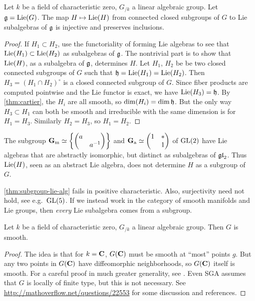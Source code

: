 \begin{theorem}\label{thm:subgroup-lie-alg}
Let $k$ be a field of characteristic zero, $G_{/k}$ a linear algebraic group. 
Let $\mathfrak{g}=\operatorname{Lie}(G)$. The map $H\mapsto \operatorname{Lie}(H)$ from connected closed subgroups 
of $G$ to Lie subalgebras of $\mathfrak{g}$ is injective and preserves inclusions. 
\end{theorem}
\begin{proof}
If $H_1\subset H_2$, use the functoriality of forming Lie algebras to see that 
$\operatorname{Lie}(H_1)\subset \operatorname{Lie}(H_2)$ as subalgebras of $\mathfrak{g}$. The nontrivial part is to 
show that $\operatorname{Lie}(H)$, as a subalgebra of $\mathfrak{g}$, determines $H$. 
Let $H_1$, $H_2$ be be two closed connected subgroups of $G$ such that 
$\mathfrak{h}=\operatorname{Lie}(H_1)=\operatorname{Lie}(H_2)$. Then $H_3=(H_1\cap H_2)^\circ$ is a closed connected 
subgroup of $G$. Since fiber products are computed pointwise and the Lie 
functor is exact, we have $\operatorname{Lie}(H_3)=\mathfrak{h}$. By \autoref{thm:cartier}, the 
$H_i$ are all smooth, so $\dim(H_i)=\dim \mathfrak{h}$. But the only way 
$H_3\subset H_1$ can both be smooth and irreducible with the same dimension is 
for $H_1=H_3$. Similarly $H_2=H_3$, so $H_1=H_2$. 
\end{proof}

\begin{example}
The subgroup 
$\mathbf{G}_\mathrm{m}\simeq \left\{\begin{pmatrix} a \\ & a^{-1} \end{pmatrix}\right\}$ 
and $\mathbf{G}_\mathrm{a}\simeq \begin{pmatrix} 1 & \ast \\ & 1 \end{pmatrix}$ of $\operatorname{GL}(2)$ have 
Lie algebras that are abstractly isomorphic, but distinct as subalgebras of 
$\mathfrak{gl}_2$. Thus $\operatorname{Lie}(H)$, seen as an abstract Lie algebra, does not determine 
$H$ as a subgroup of $G$. 
\end{example}

\autoref{thm:subgroup-lie-alg} fails in positive characteristic. Also, 
surjectivity need not hold, see e.g.~$\operatorname{GL}(5)$. If we instead work in the 
category of smooth manifolds and Lie groups, then \emph{every} Lie subalgebra 
comes from a subgroup. 

\begin{theorem}[Cartier]\label{thm:cartier}
Let $k$ be a field of characteristic zero, $G_{/k}$ a linear algebraic group. 
Then $G$ is smooth. 
\end{theorem}
\begin{proof}
The idea is that for $k=\mathbf{C}$, $G(\mathbf{C})$ must be smooth at ``most'' points 
$g$. But any two points in $G(\mathbf{C})$ have diffeomorphic neighborhoods, so 
$G(\mathbf{C})$ itself is smooth. For a careful proof in much greater generality, 
see \cite[VI\textsubscript{B} 1.6]{sga3-i}. Even SGA assumes that $G$ is 
locally of finite type, 
but this is not necessary. See \url{http://mathoverflow.net/questions/22553} 
for some discussion and references. 
\end{proof}


